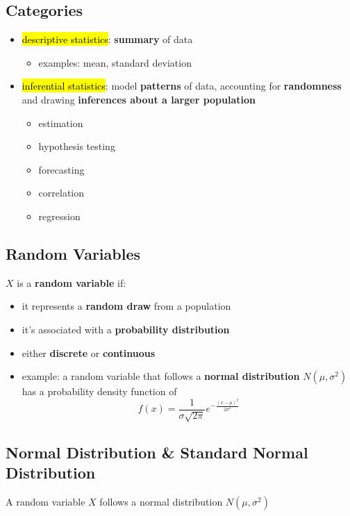 \subsection{Categories}
\begin{itemize}
	\item \hl{descriptive statistics}: \textbf{summary} of data
	
	\begin{itemize}
		
		\item examples: mean, standard deviation
	\end{itemize}
	
	\item \hl{inferential statistics}: model \textbf{patterns} of data, accounting for \textbf{randomness} and drawing \textbf{inferences about a larger population}
	\begin{itemize}
		\item estimation
		\item hypothesis testing
		\item forecasting
		\item correlation
		\item regression
	\end{itemize}
	
\end{itemize}

\subsection{Random Variables}
$X$ is a \textbf{random variable} if:
\begin{itemize}
	\item it represents a \textbf{random draw} from a population
	\item it's associated with a \textbf{probability distribution}
	\item either \textbf{discrete} or \textbf{continuous}
	\item example: a random variable that follows a \textbf{normal distribution} $N(\mu, \sigma^2)$ has a probability density function of 
	$$f(x) = \frac{1}{\sigma \sqrt{2\pi}}e^{-\frac{(x-\mu)^2}{2\sigma^2}}$$
\end{itemize}

\subsection{Normal Distribution \& Standard Normal Distribution}
A random variable $X$ follows a normal distribution $N(\mu, \sigma^2)$

